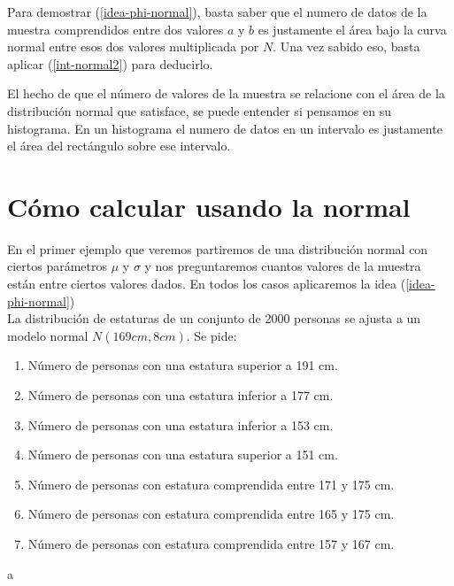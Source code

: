 Para demostrar
(\protect\hyperlink{idea-phi-normal}{{[}idea-phi-normal{]}}), basta
saber que el numero de datos de la muestra comprendidos entre dos
valores \(a\) y \(b\) es justamente el área bajo la curva normal entre
esos dos valores multiplicada por \(N\). Una vez sabido eso, basta
aplicar (\protect\hyperlink{int-normal2}{{[}int-normal2{]}}) para
deducirlo.

El hecho de que el número de valores de la muestra se relacione con el
área de la distribución normal que satisface, se puede entender si
pensamos en su histograma. En un histograma el numero de datos en un
intervalo es justamente el área del rectángulo sobre ese intervalo.

\hypertarget{cuxf3mo-calcular-usando-la-normal}{%
\section{Cómo calcular usando la
normal}\label{cuxf3mo-calcular-usando-la-normal}}

En el primer ejemplo que veremos partiremos de una distribución normal
con ciertos parámetros \(\mu\) y \(\sigma\) y nos preguntaremos cuantos
valores de la muestra están entre ciertos valores dados. En todos los
casos aplicaremos la idea
(\protect\hyperlink{idea-phi-normal}{{[}idea-phi-normal{]}})\\

La distribución de estaturas de un conjunto de 2000 personas se ajusta a
un modelo normal \(N(169cm,8cm)\). Se pide:

\begin{enumerate}
\def\labelenumi{\arabic{enumi}.}
\item
  Número de personas con una estatura superior a 191 cm.
\item
  Número de personas con una estatura inferior a 177 cm.
\item
  Número de personas con una estatura inferior a 153 cm.
\item
  Número de personas con una estatura superior a 151 cm.
\item
  Número de personas con estatura comprendida entre 171 y 175 cm.
\item
  Número de personas con estatura comprendida entre 165 y 175 cm.
\item
  Número de personas con estatura comprendida entre 157 y 167 cm.
\end{enumerate}

{a}

